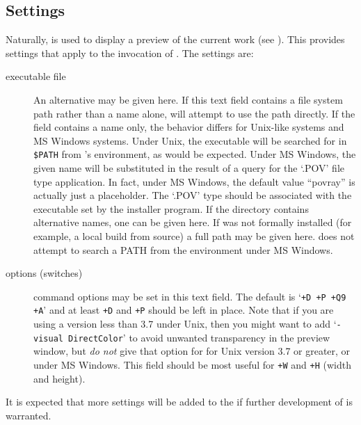 		\subsection{\dtypovhdr{} Settings}%
		\label{ssec:prefs_povray}
		Naturally, \IXpov{} is used to display a preview of
		the current work (see ).
		This  provides settings that apply to
		the invocation of \IXpov{}.
		The \IXpov{} settings are:

			\begin{description}
			  \item[\IXpov{} executable file] An alternative may
			  be given here. If this text field contains a file system
			  path rather than a name alone, \IXpkg{} will attempt
			  to use the path directly. If the field contains a name
			  only, the behavior differs for Unix-like systems and
			  MS Windows systems. Under Unix, the executable will be
			  searched for in \texttt{\$PATH} from \IXpkg{}'s
			  environment, as would be expected. Under MS Windows,
			  the given name will be substituted in the result of
			  a query for the `.POV' file type application. In fact,
			  under MS Windows, the default value ``povray'' is
			  actually just a placeholder. The `.POV' type should
			  be associated with the executable set by the \IXpov{}
			  installer program. If the \IXpov{} directory contains
			  alternative names, one can be given here. If \IXpov{}
			  was not formally installed (for example, a local build
			  from source) a full path may be given here. \IXpkgu{}
			  does not attempt to search a PATH from the environment
			  under MS Windows.
			  \item[\IXpov{} options (switches)] \IXpov{} command
			  options may be set in this text field. The default
			  is `\texttt{+D +P +Q9 +A}' and at least
			  \texttt{+D} and \texttt{+P} should be left in place.
			  Note that if you are using a \IXpov{} version less
			  than 3.7 under Unix, then you might want to add
			  `\texttt{-visual DirectColor}' to avoid unwanted
			  transparency in the preview window, but \emph{do not}
			  give that option for \IXpov{} for Unix version 3.7 or
			  greater, or under MS Windows. This field should be most
			  useful for \texttt{+W} and \texttt{+H}
			  (width and height).
			\end{description}

	It is expected that more settings will be added to the
	  if further development
	of \IXpkg{} is warranted.
